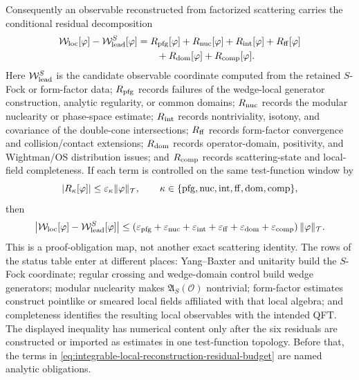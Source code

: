 \begin{remark}
Consequently an observable reconstructed from factorized scattering carries
the conditional residual decomposition
\begin{equation}
\begin{aligned}
  \mathcal W_{\rm loc}[\varphi]
  -
  \mathcal W_{\rm lead}^{S}[\varphi]
  &=
  R_{\rm pfg}[\varphi]
  +R_{\rm nuc}[\varphi]
  +R_{\rm int}[\varphi]
  +R_{\rm ff}[\varphi]  \\
  &\qquad
  +R_{\rm dom}[\varphi]
  +R_{\rm comp}[\varphi] .
\end{aligned}
  \label{eq:integrable-local-reconstruction-residual-budget}
\end{equation}
Here \(\mathcal W_{\rm lead}^{S}\) is the candidate observable coordinate
computed from the retained \(S\)-Fock or form-factor data; \(R_{\rm pfg}\)
records failures of the wedge-local generator construction, analytic
regularity, or common domains; \(R_{\rm nuc}\) records the modular nuclearity
or phase-space estimate; \(R_{\rm int}\) records nontriviality, isotony, and
covariance of the double-cone intersections; \(R_{\rm ff}\) records
form-factor convergence and collision/contact extensions; \(R_{\rm dom}\)
records operator-domain, positivity, and Wightman/OS distribution issues; and
\(R_{\rm comp}\) records scattering-state and local-field completeness.
If each term is controlled on the same test-function window by
\[
  |R_\kappa[\varphi]|\le\varepsilon_\kappa\|\varphi\|_{\mathcal T},
  \qquad
  \kappa\in
  \{{\rm pfg},{\rm nuc},{\rm int},{\rm ff},{\rm dom},{\rm comp}\},
\]
then
\begin{equation}
  \left|
    \mathcal W_{\rm loc}[\varphi]
    -
    \mathcal W_{\rm lead}^{S}[\varphi]
  \right|
  \le
  \left(
    \varepsilon_{\rm pfg}
    +\varepsilon_{\rm nuc}
    +\varepsilon_{\rm int}
    +\varepsilon_{\rm ff}
    +\varepsilon_{\rm dom}
    +\varepsilon_{\rm comp}
  \right)\|\varphi\|_{\mathcal T}.
  \label{eq:integrable-local-reconstruction-residual-bound}
\end{equation}
This is a proof-obligation map, not another exact scattering identity.  The
rows of the status table enter at different places: Yang--Baxter and
unitarity build the \(S\)-Fock coordinate; regular crossing and wedge-domain
control build wedge generators; modular nuclearity makes
\(\mathfrak A_S(\mathcal O)\) nontrivial; form-factor estimates construct
pointlike or smeared local fields affiliated with that local algebra; and
completeness identifies the resulting local observables with the intended
QFT.  The displayed inequality has numerical content only after the six
residuals are constructed or imported as estimates in one test-function
topology.  Before that, the terms in
\eqref{eq:integrable-local-reconstruction-residual-budget} are named analytic
obligations.


\end{remark}
